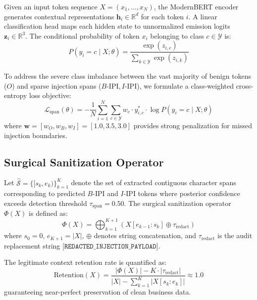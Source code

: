 \documentclass[conference]{IEEEtran}
\begin{document}
Given an input token sequence $X = (x_1, \dots, x_N)$, the ModernBERT encoder generates contextual representations $\mathbf{h}_i \in \mathbb{R}^d$ for each token $i$. A linear classification head maps each hidden state to unnormalized emission logits $\mathbf{z}_i \in \mathbb{R}^3$. The conditional probability of token $x_i$ belonging to class $c \in \mathcal{Y}$ is:
\begin{equation}
    P(y_i = c \mid X; \theta) = \frac{\exp(z_{i, c})}{\sum_{k \in \mathcal{Y}} \exp(z_{i, k})}
\end{equation}

To address the severe class imbalance between the vast majority of benign tokens ($O$) and sparse injection spans ($B\text{-IPI}, I\text{-IPI}$), we formulate a class-weighted cross-entropy loss objective:
\begin{equation}
    \mathcal{L}_{\text{span}}(\theta) = -\frac{1}{N} \sum_{i=1}^{N} \sum_{c \in \mathcal{Y}} w_c \cdot y_{i, c}^* \cdot \log P(y_i = c \mid X; \theta)
\end{equation}
where $\mathbf{w} = [w_O, w_B, w_I] = [1.0, 3.5, 3.0]$ provides strong penalization for missed injection boundaries.

\subsection{Surgical Sanitization Operator}

Let $\hat{\mathcal{S}} = \{[s_k, e_k)\}_{k=1}^K$ denote the set of extracted contiguous character spans corresponding to predicted $B\text{-IPI}$ and $I\text{-IPI}$ tokens where posterior confidence exceeds detection threshold $\tau_{\text{span}} = 0.50$. The surgical sanitization operator $\Phi(X)$ is defined as:
\begin{equation}
    \Phi(X) = \bigoplus_{k=1}^{K+1} \left( X[e_{k-1} : s_k] \oplus \tau_{\text{redact}} \right)
\end{equation}
where $s_0 = 0$, $e_{K+1} = |X|$, $\oplus$ denotes string concatenation, and $\tau_{\text{redact}}$ is the audit replacement string $\texttt{[REDACTED\_INJECTION\_PAYLOAD]}$. 

The legitimate context retention rate is quantified as:
\begin{equation}
    \text{Retention}(X) = \frac{|\Phi(X)| - K \cdot |\tau_{\text{redact}}|}{|X| - \sum_{k=1}^K |X[s_k : e_k]|} \approx 1.0
\end{equation}
guaranteeing near-perfect preservation of clean business data.
\end{document}
